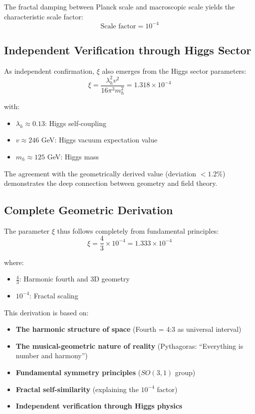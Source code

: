 \documentclass[12pt,a4paper]{article}
\begin{document}
The fractal damping between Planck scale and macroscopic scale yields the characteristic scale factor:
\begin{equation}
	\text{Scale factor} = 10^{-4}
\end{equation}

\subsection{Independent Verification through Higgs Sector}

As independent confirmation, $\xi$ also emerges from the Higgs sector parameters:
\begin{equation}
	\xi = \frac{\lambda_h^2 v^2}{16\pi^3 m_h^2} = 1.318 \times 10^{-4}
\end{equation}

with:
\begin{itemize}
	\item $\lambda_h \approx 0.13$: Higgs self-coupling
	\item $v \approx 246$ GeV: Higgs vacuum expectation value
	\item $m_h \approx 125$ GeV: Higgs mass
\end{itemize}

The agreement with the geometrically derived value (deviation $< 1.2\%$) demonstrates the deep connection between geometry and field theory.

\subsection{Complete Geometric Derivation}

The parameter $\xi$ thus follows completely from fundamental principles:
\begin{equation}
	\xi = \frac{4}{3} \times 10^{-4} = 1.333 \times 10^{-4}
\end{equation}

where:
\begin{itemize}
	\item $\frac{4}{3}$: Harmonic fourth and 3D geometry
	\item $10^{-4}$: Fractal scaling
\end{itemize}

This derivation is based on:
\begin{itemize}
	\item \textbf{The harmonic structure of space} (Fourth = 4:3 as universal interval)
	\item \textbf{The musical-geometric nature of reality} (Pythagoras: ``Everything is number and harmony'')
	\item \textbf{Fundamental symmetry principles} ($SO(3,1)$ group)
	\item \textbf{Fractal self-similarity} (explaining the $10^{-4}$ factor)
	\item \textbf{Independent verification through Higgs physics}
\end{itemize}
\end{document}
